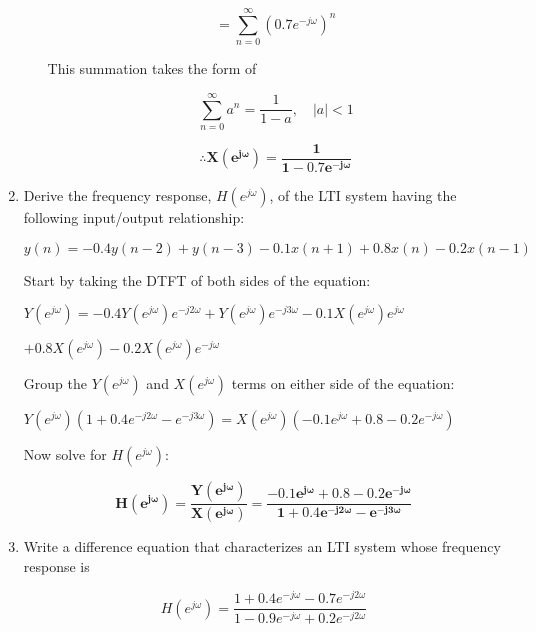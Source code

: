 \documentclass[fleqn]{article}
\begin{document}
\begin{enumerate}[nolistsep]
\begin{enumerate}[nolistsep]
					\begin{equation*}
						= \sum_{n=0}^{\infty}(0.7e^{-j{\omega}})^n
					\end{equation*}
					
					This summation takes the form of
					
					\begin{equation*}
						\sum_{n=0}^{\infty}a^n = \frac{1}{1-a},\quad |a| < 1
					\end{equation*}
					
					\begin{equation*}
						\mathbf{\therefore X(e^{j\omega}) = \frac{1}{1 - 0.7e^{-j\omega}}}
					\end{equation*}
			\end{enumerate}
		
		\pagebreak
		\item Derive the frequency response, $H(e^{j\omega})$, of the LTI system having the following input/output relationship:
		
			$y(n) = -0.4y(n-2)+y(n-3)-0.1x(n+1)+0.8x(n)-0.2x(n-1)$
			
			Start by taking the DTFT of both sides of the equation:
			
			$Y(e^{j\omega}) = -0.4Y(e^{j\omega})e^{-j2\omega}+Y(e^{j\omega})e^{-j3\omega}-0.1X(e^{j\omega})e^{j\omega}$
			
			$+0.8X(e^{j\omega})-0.2X(e^{j\omega})e^{-j\omega}$
			
			Group the $Y(e^{j\omega})$ and $X(e^{j\omega})$ terms on either side of the equation:
			
			$Y(e^{j\omega})(1 + 0.4e^{-j2\omega} - e^{-j3\omega}) = X(e^{j\omega})(-0.1e^{j\omega} + 0.8 - 0.2e^{-j\omega})$
			
			Now solve for $H(e^{j\omega})$:
			
			\begin{equation*}
				\mathbf{H(e^{j\omega}) = \frac{Y(e^{j\omega})}{X(e^{j\omega})} = \frac{-0.1e^{j\omega} + 0.8 - 0.2e^{-j\omega}}{1 + 0.4e^{-j2\omega} - e^{-j3\omega}}}
			\end{equation*}
		\item Write a difference equation that characterizes an LTI system whose frequency response is
		
			\begin{equation*}
				H(e^{j\omega}) = \frac{1 + 0.4e^{-j\omega} - 0.7e^{-j2\omega}}{1 - 0.9e^{-j\omega} + 0.2e^{-j2\omega}}
			\end{equation*}
			

\end{enumerate}
\end{document}
